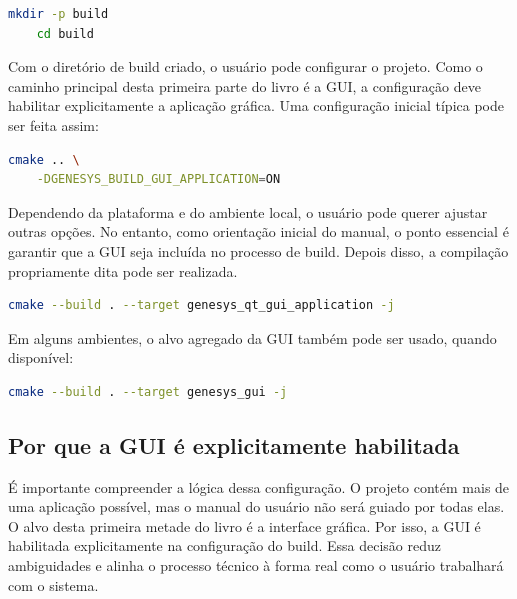 \begin{lstlisting}[language=bash,caption={Criação do diretório de build},label={lst:cap2_criacao_build}]
    mkdir -p build
    cd build
\end{lstlisting}

Com o diretório de build criado, o usuário pode configurar o projeto. Como o caminho principal desta primeira parte do livro é a GUI, a configuração deve habilitar explicitamente a aplicação gráfica. Uma configuração inicial típica pode ser feita assim:

\begin{lstlisting}[language=bash,caption={Configuração inicial do build da GUI},label={lst:cap2_configuracao_gui}]
    cmake .. \
    -DGENESYS_BUILD_GUI_APPLICATION=ON
\end{lstlisting}

Dependendo da plataforma e do ambiente local, o usuário pode querer ajustar outras opções. No entanto, como orientação inicial do manual, o ponto essencial é garantir que a GUI seja incluída no processo de build. Depois disso, a compilação propriamente dita pode ser realizada.

\begin{lstlisting}[language=bash,caption={Compilação da GUI do GenESyS},label={lst:cap2_compilacao_gui}]
    cmake --build . --target genesys_qt_gui_application -j
\end{lstlisting}

Em alguns ambientes, o alvo agregado da GUI também pode ser usado, quando disponível:

\begin{lstlisting}[language=bash,caption={Alternativa de compilação pelo alvo agregado da GUI},label={lst:cap2_compilacao_gui_agregada}]
    cmake --build . --target genesys_gui -j
\end{lstlisting}

\subsection{Por que a GUI é explicitamente habilitada}
\label{subsec:cap2_por_que_gui_habilitada}

É importante compreender a lógica dessa configuração. O projeto contém mais de uma aplicação possível, mas o manual do usuário não será guiado por todas elas. O alvo desta primeira metade do livro é a interface gráfica. Por isso, a GUI é habilitada explicitamente na configuração do build. Essa decisão reduz ambiguidades e alinha o processo técnico à forma real como o usuário trabalhará com o sistema.


